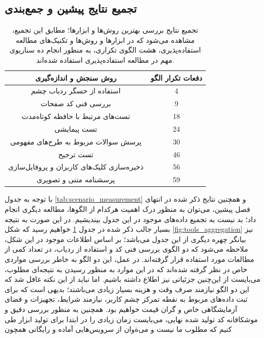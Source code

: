\subsection{تجمیع نتایج پیشین و جمع‌بندی}
\begin{table}[H]
	\caption[
	تجمیع نتایج بررسی بهترین روش‌ها و ابزارها
	]{
		تجمیع نتایج بررسی بهترین روش‌ها و ابزارها؛ مطابق این تجمیع، مشاهده می‌شود که در ابزارها و روش‌ها و تکنیک‌های مطالعه استفاده‌پذیری، هشت الگوی تکراری، به منظور انجام ده سناریوی مهم در مطالعه استفاده‌پذیری استفاده شده‌اند.
	}
	\label{tab:tools_aggregated}
	\centering
	\begin{tabular}{|c|c|}
		\hline
		روش سنجش و اندازه‌گیری & دفعات تکرار الگو \\ \hline
		استفاده از حسگر ردیاب چشم & 4 \\ \hline
		بررسی فنی کد صفحات & 9 \\ \hline
		تست‌های مرتبط با حافظه کوتاه‌مدت & 18 \\ \hline
		تست پیمایشی & 24 \\ \hline
		پرسش سوالات مربوط به طرح‌های مفهومی & 30 \\ \hline
		تست ترجیح & 46 \\ \hline
		ذخیره‌سازی کلیک‌های کاربران و پروفایل‌سازی & 56 \\ \hline
		پرسشنامه متنی و تصویری & 59 \\ \hline
	\end{tabular}
\end{table}
با توجه به جدول
\ref{tab:scenario_measurement}
و همچنین نتایج ذکر شده در انتهای فصل پیشین، می‌توان به منظور درک اهمیت هرکدام از الگوها، مطالعه دیگری انجام داد؛ بد نیست به تجمیع داده‌های موجود در این جدول بیندیشیم. در این صورت به نتیجه بسیار جالب ذکر شده در جدول
\ref{tab:tools_aggregated}
خواهیم رسید که شکل
\ref{fig:tools_aggregation}
نیز بیانگر چهره دیگری از این جدول می‌باشد؛ بر اساس اطلاعات موجود در این شکل، ملاحظه می‌شود که دو الگوی بررسی فنی کد و استفاده از ردیاب، در تعداد کمی از مطالعات مورد استفاده قرار گرفته‌اند. در عمل، این دو الگو به خاطر بررسی مواردی خاص در نظر گرفته شده‌اند که در این موارد به منظور رسیدن به نتیجه‌ای مطلوب، می‌بایست از این‌چنین جزئیاتی نیز اطلاع داشته باشیم. اما نباید از این نکته غافل شد که این دو الگو نیازمند صرف وقت و هزینه بسیار زیادی می‌باشند؛ بدیهی است که برای ثبت داده‌های مربوط به نقطه تمرکز چشم کاربر، نیازمند شرایط، تجهیزات و فضای آزمایشگاهی خاص و گران قیمت خواهیم بود. همچنین به منظور بررسی دقیق و موشکافانه کد تولید شده نهایی، می‌بایست زمان زیادی را در ابتدا برای تولید ابزار طی کنیم که مطلوب ما نیست و می‌ةوان از سرویس‌هایی آماده و رایگانی همچون
